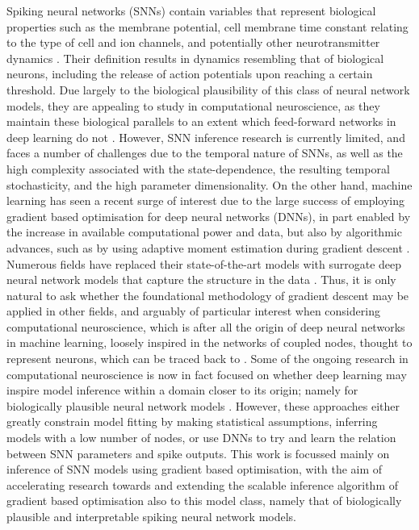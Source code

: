 \documentclass[mphil,deptreport,ianc]{infthesis} %
\begin{document}
Spiking neural networks (SNNs) contain variables that represent biological properties such as the membrane potential, cell membrane time constant relating to the type of cell and ion channels, and potentially other neurotransmitter dynamics \cite{Johnson2017}.
Their definition results in dynamics resembling that of biological neurons, including the release of action potentials upon reaching a certain threshold.
Due largely to the biological plausibility of this class of neural network models, they are appealing to study in computational neuroscience, as they maintain these biological parallels to an extent which feed-forward networks in deep learning do not \cite{Wu2018, Taherkhani2018, Taherkhani2020}.
However, SNN inference research is currently limited, and faces a number of challenges due to the temporal nature of SNNs, as well as the high complexity associated with the state-dependence, the resulting temporal stochasticity, and the high parameter dimensionality.
On the other hand, machine learning has seen a recent surge of interest due to the large success of employing gradient based optimisation for deep neural networks (DNNs), in part enabled by the increase in available computational power and data, but also by algorithmic advances, such as by using adaptive moment estimation during gradient descent \cite{Schmidhuber2014, Bengio2011}.
Numerous fields have replaced their state-of-the-art models with surrogate deep neural network models that capture the structure in the data \cite{Lueckmann2018, Lueckmann2021, Tejero-Cantero2020, Cranmer2020, Greenberg}.
Thus, it is only natural to ask whether the foundational methodology of gradient descent may be applied in other fields, and arguably of particular interest when considering computational neuroscience, which is after all the origin of deep neural networks in machine learning, loosely inspired in the networks of coupled nodes, thought to represent neurons, which can be traced back to \cite{McCulloch1943}.
Some of the ongoing research in computational neuroscience is now in fact focused on whether deep learning may inspire model inference within a domain closer to its origin; namely for biologically plausible neural network models \cite{GrunSonjaRotter2010, Schwalger2017, Taherkhani2020}.
However, these approaches either greatly constrain model fitting by making statistical assumptions, inferring models with a low number of nodes, or use DNNs to try and learn the relation between SNN parameters and spike outputs.
This work is focussed mainly on inference of SNN models using gradient based optimisation, with the aim of accelerating research towards and extending the scalable inference algorithm of gradient based optimisation also to this model class, namely that of biologically plausible and interpretable spiking neural network models.
\end{document}
